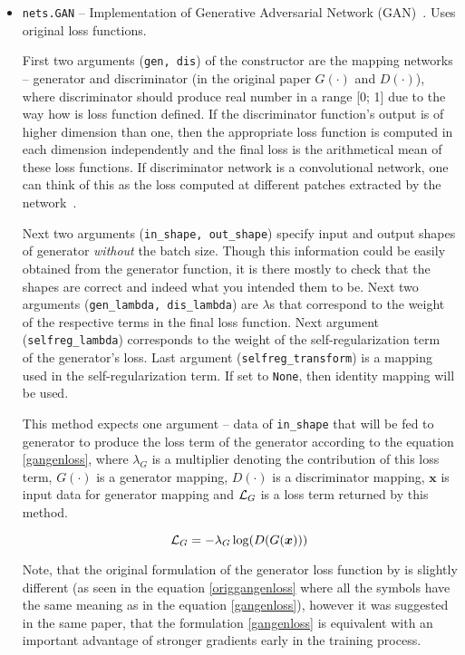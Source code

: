 \begin{itemize}
\item \texttt{nets.GAN} -- Implementation of Generative Adversarial Network (GAN)~\cite{origgan}. Uses original loss functions.

\begin{description}
 First two arguments (\texttt{gen, dis}) of the constructor are the mapping networks -- generator and discriminator (in the original paper $G(\cdot)$ and $D(\cdot)$), where discriminator should produce real number in a range [0; 1] due to the way how is loss function defined. If the discriminator function's output is of higher dimension than one, then the appropriate loss function is computed in each dimension independently and the final loss is the arithmetical mean of these loss functions. If discriminator network is a convolutional network, one can think of this as the loss computed at different patches extracted by the network~\cite{historypool}.

Next two arguments (\texttt{in\_shape, out\_shape}) specify input and output shapes of generator {\em without} the batch size. Though this information could be easily obtained from the generator function, it is there mostly to check that the shapes are correct and indeed what you intended them to be. Next two arguments (\texttt{gen\_lambda, dis\_lambda}) are $\lambda$s that correspond to the weight of the respective terms in the final loss function. Next argument (\texttt{selfreg\_lambda}) corresponds to the weight of the self-regularization term~\cite{historypool} of the generator's loss. Last argument (\texttt{selfreg\_transform}) is a mapping used in the self-regularization term. If set to \texttt{None}, then identity mapping will be used.

 This method expects one argument -- data of \texttt{in\_shape} that will be fed to generator to produce the loss term of the generator according to the equation \ref{gangenloss}, where $\lambda_G$ is a multiplier denoting the contribution of this loss term, $G(\cdot)$ is a generator mapping, $D(\cdot)$ is a discriminator mapping, $\bm{x}$ is input data for generator mapping and $\mathcal{L}_{G}$ is a loss term returned by this method.

\begin{equation}
\mathcal{L}_{G} = -\lambda_G\log(D(G(\bm{x})))
\label{gangenloss}
\end{equation}

Note, that the original formulation of the generator loss function by \cite{origgan} is slightly different (as seen in the equation \ref{origgangenloss} where all the symbols have the same meaning as in the equation \ref{gangenloss}), however it was suggested in the same paper, that the formulation \ref{gangenloss} is equivalent with an important advantage of stronger gradients early in the training process.


\end{description}
\end{itemize}
